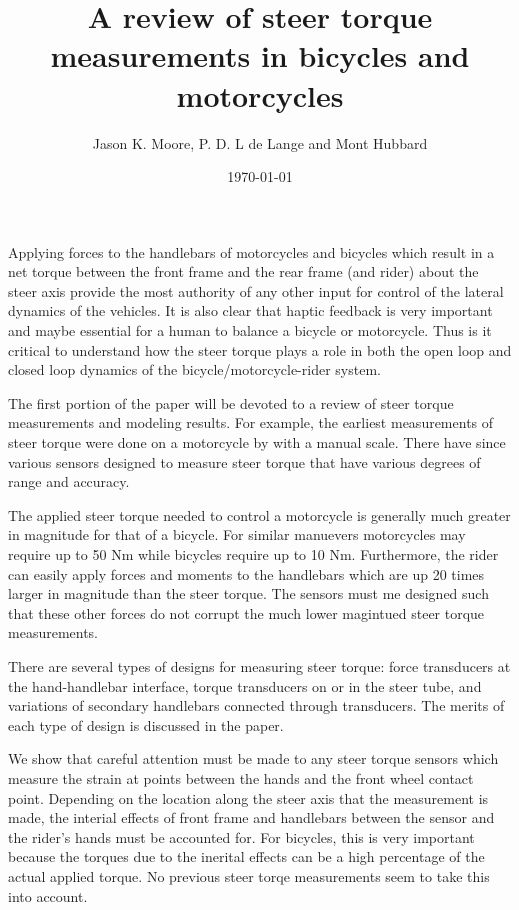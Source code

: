 \documentclass{article}
\title{A review of steer torque measurements in bicycles and motorcycles}
\author{Jason K. Moore, P. D. L de Lange and Mont Hubbard}
\date{\today}
\begin{document}
\maketitle

Applying forces to the handlebars of motorcycles and bicycles which result in a
net torque between the front frame and the rear frame (and rider) about the
steer axis provide the most authority of any other input for control of the
lateral dynamics of the vehicles. It is also clear that haptic feedback is very
important and maybe essential for a human to balance a bicycle or motorcycle.
Thus is it critical to understand how the steer torque plays a role in both the
open loop and closed loop dynamics of the bicycle/motorcycle-rider system.

The first portion of the paper will be devoted to a review of steer torque
measurements and modeling results. For example, the earliest measurements of
steer torque were done on a motorcycle by \cite{Wilson-Jones1951} with a manual
scale. There have since various sensors designed to measure steer torque that
have various degrees of range and accuracy.

The applied steer torque needed to control a motorcycle is generally much
greater in magnitude for that of a bicycle. For similar manuevers motorcycles
may require up to 50 Nm while bicycles require up to 10 Nm. Furthermore, the
rider can easily apply forces and moments to the handlebars which are up 20
times larger in magnitude than the steer torque. The sensors must me designed
such that these other forces do not corrupt the much lower magintued steer
torque measurements.

There are several types of designs for measuring steer torque: force
transducers at the hand-handlebar interface, torque transducers on or in the
steer tube, and variations of secondary handlebars connected through
transducers. The merits of each type of design is discussed in the paper.

We show that careful attention must be made to any steer torque sensors which
measure the strain at points between the hands and the front wheel contact point.
Depending on the location along the steer axis that the measurement is made,
the interial effects of front frame and handlebars between the sensor and the
rider's hands must be accounted for. For bicycles, this is very important
because the torques due to the inerital effects can be a high percentage of the
actual applied torque. No previous steer torqe measurements seem to take this
into account.
\end{document}
